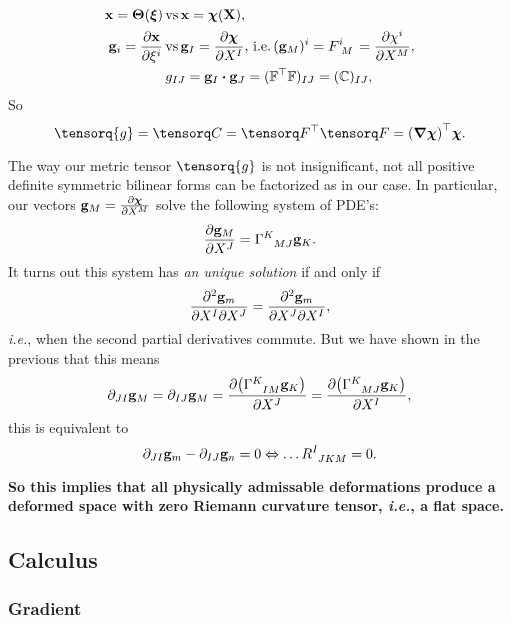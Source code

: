 \documentclass[../main.tex]{subfiles}
\begin{document}
\begin{tcolorbox}
\begin{example}
	\begin{align*}
		\vb{x} = \vb*{\Theta}\qty(\vb*{\xi}) \, &\text{vs} \, \vb{x}=\vb*{\chi}\qty(\vb{X}), \\
		\vb{g}_i = \pdv{\vb{x}}{\xi^i} \, &\text{vs} \, \vb{g}_I = \pdv{\vb*{\chi}}{X^I}, \, \text{i.e.} \, (\vb{g}_M)^i = F \indices{^i_M} = \pdv{\chi^i}{X^M}, \\
						  &	g_{IJ}=\vb{g}_I \vdot \vb{g}_J = (\transpose{\fgrad} \fgrad)_{IJ}=(\rcg)_{IJ}, \\
	\end{align*}
	So
	\begin{equation}
		\label{eq:cauchy_metric}
		\tensorq{g}=\rcg = \transpose{\fgrad}\fgrad = \transpose{\qty(\grad \vb*{\chi})} \vb*{\chi}.
	\end{equation}

	The way our metric tensor $\tensorq{g}$ is not insignificant, not all positive definite symmetric bilinear forms can be factorized as in our case. In particular, our vectors $\vb{g}_M = \pdv{\vb*{\chi}}{X^M}$ solve the following system of PDE's:
	\[
		\pdv{\vb{g}_M}{X^J} = \Gamma \indices{^K_{MJ}}\vb{g}_K.
	\]
	It turns out \cite{ciarletIntroductionDifferentialGeometry2005} this system has \textit{an unique solution} if and only if
	\[
		\pdv{\vb{g}_m}{X^I}{X^J}  = \pdv{\vb{g}_m}{X^J}{X^I},
	\]
	\textit{i.e.}, when the second partial derivatives commute. But we have shown in the previous that this means
	\begin{equation*}
		\partial_{JI}\vb{g}_M = \partial_{IJ}\vb{g}_M = \pdv{\qty(\Gamma \indices{^K_{IM}} \vb{g}_K)}{X^J} = \pdv{\qty(\Gamma \indices{^K_{MJ}} \vb{g}_K)}{X^I} ,
	\end{equation*}
	this is equivalent to 
	\[
		\partial_{JI}\vb{g}_m - \partial_{IJ} \vb{g}_n =0 \Leftrightarrow \dots R \indices{^I_{JKM}} = 0.
	\]
\end{example}
\textbf{So this implies that all physically admissable deformations produce a deformed space with zero Riemann curvature tensor, \textit{i.e.}, a flat space.}
\end{tcolorbox}

\subsection{Calculus}
\label{sec:calculus}

\subsubsection{Gradient}
\label{sec:gradient}
\end{document}
